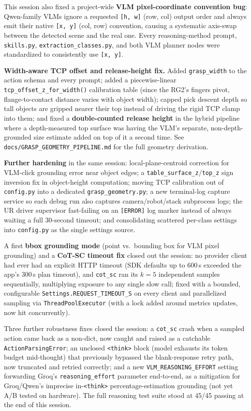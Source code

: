 This session also fixed a project-wide \textbf{VLM pixel-coordinate
convention bug}: Qwen-family VLMs ignore a requested \texttt{[h, w]}
(row, col) output order and always emit their native \texttt{[x, y]}
(col, row) convention, causing a systematic axis-swap between the detected
scene and the real one. Every reasoning-method prompt, \texttt{skills.py},
\texttt{extraction\_classes.py}, and both VLM planner nodes were standardized
to consistently use \texttt{[x, y]}.

\textbf{Width-aware TCP offset and release-height fix.} Added
\texttt{grasp\_width} to the action schema and every prompt; added a
piecewise-linear \texttt{tcp\_offset\_z\_for\_width()} calibration table
(since the RG2's fingers pivot, flange-to-contact distance varies with
object width); capped pick descent depth so tall objects are gripped nearer
their top instead of driving the rigid TCP clamp into them; and fixed a
\textbf{double-counted release height} in the hybrid pipeline where a
depth-measured top surface was having the VLM's separate, non-depth-grounded
size estimate added on top of it a second time. See
\texttt{docs/GRASP\_GEOMETRY\_PIPELINE.md} for the full geometry derivation.

\textbf{Further hardening} in the same session: local-plane-centroid
correction for VLM-click grounding error near object edges; a
\texttt{table\_surface\_z}/\texttt{top\_z} sign inversion fix in object-height
computation; moving TCP calibration out of \texttt{config.py} into a
dedicated \texttt{grasp\_geometry.py}; a new terminal-log capture service so
each debug run also captures camera/robot/stack subprocess logs; the UR
driver supervisor fast-failing on an \texttt{[ERROR]} log marker instead of
always waiting a full 30-second timeout; and consolidating scattered
per-class settings into \texttt{config.py} as the single settings source.

A first \textbf{bbox grounding mode} (point vs.\ bounding box for VLM pixel
grounding) and a \textbf{CoT-SC timeout fix} closed out the session: no
provider client had ever had an explicit HTTP timeout (SDK defaults up to
600\,s exceeded the app's 300\,s plan timeout), and \texttt{cot\_sc} ran its
$k{=}5$ independent samples sequentially, multiplying exposure to any single
slow call; fixed with a bounded, configurable
\texttt{Settings.REQUEST\_TIMEOUT\_S} on every client and parallelized
sampling via \texttt{ThreadPoolExecutor} (with a lock added around metrics
updates, now hit concurrently).

Three further robustness fixes closed the session: a \texttt{cot\_sc}
crash when a sampled action came back as a non-dict, now caught and raised as
a catchable \texttt{ActionParsingError}; an unclosed \texttt{<think>} block
(model exhausts its token budget mid-thought) that previously bypassed the
blank-response retry path, now truncated and retried correctly; and a new
\texttt{VLM\_REASONING\_EFFORT} setting forwarding Groq's
\texttt{reasoning\_effort} parameter end-to-end, as a mitigation for
Groq/Qwen's imprecise in-\texttt{<think>} percentage-estimation grounding
(not yet A/B tested on hardware). The full reasoning test suite stood at
45/45 passing at the end of this session.

